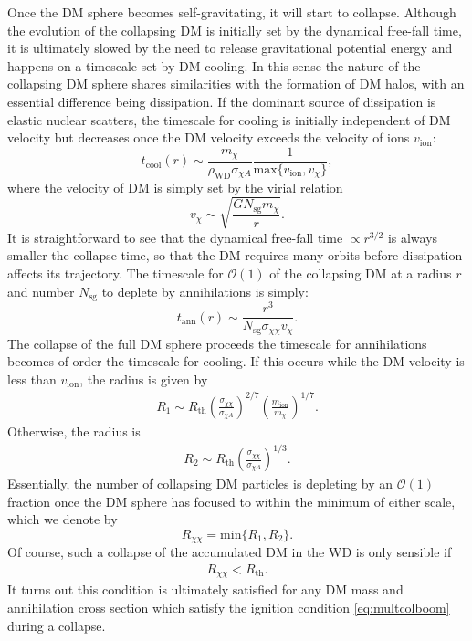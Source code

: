 \documentclass[preprintnumbers,amsmath,amssymb,prd,superscriptaddress]{revtex4}
\newcommand{\OO}{\mathcal{O}}
\def\r{\right)}
\def\l{\left(}
\begin{document}
Once the DM sphere becomes self-gravitating, it will start to collapse. 
Although the evolution of the collapsing DM is initially set by the dynamical free-fall time, it is ultimately slowed by the need to release gravitational potential energy and happens on a timescale set by DM cooling. 
In this sense the nature of the collapsing DM sphere shares similarities with the formation of DM halos, with an essential difference being dissipation. 
If the dominant source of dissipation is elastic nuclear scatters, the timescale for cooling is initially independent of DM velocity but decreases once the DM velocity exceeds the velocity of ions $v_\text{ion}$:
\begin{equation}
t_\text{cool}(r) \sim \frac{m_\chi}{\rho_\text{WD} \sigma_{\chi A}} \frac{1}{\text{max}\{{v_\text{ion},v_\chi\}}},
\end{equation}
where the velocity of DM is simply set by the virial relation 
\begin{equation}
v_\chi \sim \sqrt{\frac{G N_\text{sg} m_\chi}{r}}. 
\end{equation}
It is straightforward to see that the dynamical free-fall time $\propto r^{3/2}$ is always smaller the collapse time, so that the DM requires many orbits before dissipation affects its trajectory. 
The timescale for $\OO(1)$ of the collapsing DM at a radius $r$ and number $N_\text{sg}$ to deplete by annihilations is simply:
\begin{equation}
t_\text{ann}(r) \sim \frac{r^3}{N_\text{sg} \sigma_{\chi \chi} v_\chi}. 
\end{equation}
The collapse of the full DM sphere proceeds the timescale for annihilations becomes of order the timescale for cooling.
If this occurs while the DM velocity is less than $v_\text{ion}$, the radius is given by
\begin{align}
R_1 \sim R_\text{th} \l \frac{\sigma_{\chi \chi}}{\sigma_{\chi A}}\r^{2/7} \l \frac{m_\text{ion}}{m_\chi} \r^{1/7}.
\end{align}
Otherwise, the radius is
\begin{align}
R_2 \sim R_\text{th} \l \frac{\sigma_{\chi \chi}}{\sigma_{\chi A}}\r^{1/3}. 
\end{align}
Essentially, the number of collapsing DM particles is depleting by an $\OO(1)$ fraction once the DM sphere has focused to within the minimum of either scale, which we denote by
\begin{equation}
R_{\chi \chi} =  \text{min}\{R_1, R_2\}. 
\end{equation}
Of course, such a collapse of the accumulated DM in the WD is only sensible if
\begin{align}
\label{eq:xicondition}
R_{\chi \chi} < R_\text{th}.
\end{align}
It turns out this condition is ultimately satisfied for any DM mass and annihilation cross section which satisfy the ignition condition \eqref{eq:multcolboom} during a collapse. 
\end{document}
